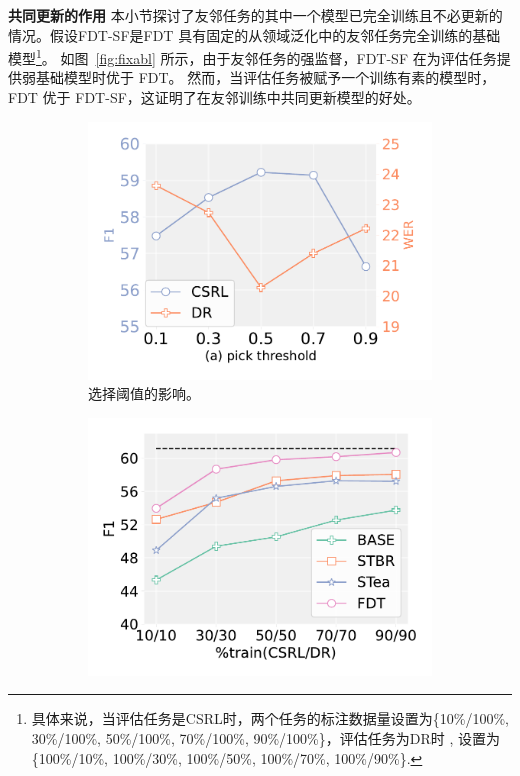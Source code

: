 \noindent\textbf{共同更新的作用 } 本小节探讨了友邻任务的其中一个模型已完全训练且不必更新的情况。假设FDT-SF是FDT 具有固定的从领域泛化中的友邻任务完全训练的基础模型\footnote{具体来说，当评估任务是CSRL时，两个任务的标注数据量设置为\{10\%/100\%, 30\%/100\%, 50\%/100\%, 70\%/100\%, 90\%/100\%\}，评估任务为DR时 , 设置为\{100\%/10\%, 100\%/30\%, 100\%/50\%, 100\%/70\%, 100\%/90\%\}.}。 如图~\ref{fig:fixabl} 所示，由于友邻任务的强监督，FDT-SF 在为评估任务提供弱基础模型时优于 FDT。 然而，当评估任务被赋予一个训练有素的模型时，FDT 优于 FDT-SF，这证明了在友邻训练中共同更新模型的好处。


\begin{figure}[!htbp]
\centering
    \begin{subfigure}[t]{0.31\textwidth}
    \centering
    \includegraphics[width=\textwidth]{pics/abla_pick_threshold.pdf}
    \caption{选择阈值的影响。}\label{fig:thres}
    \end{subfigure}
    \quad
    \begin{subfigure}[t]{0.31\textwidth}
    \centering
    \includegraphics[width=\textwidth]{pics/abla_initial_teacher_csrl.pdf}

\end{subfigure}
\end{figure}
